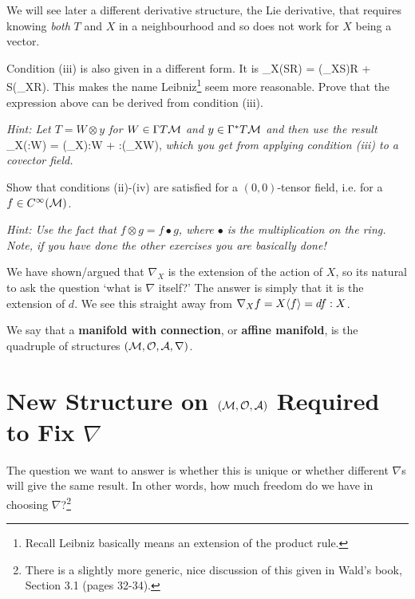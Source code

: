 We will see later a different derivative structure, the Lie derivative, that requires knowing \textit{both} $T$ and $X$ in a neighbourhood and so does not work for $X$ being a vector. 

\bbox
    Condition (iii) is also given in a different form. It is
    \bse 
        \nabla_X(S\otimes R) = (\nabla_XS)\otimes R + S\otimes (\nabla_XR).
    \ese
    This makes the name Leibniz\footnote{Recall Leibniz basically means an extension of the product rule.} seem more reasonable. Prove that the expression above can be derived from condition (iii). 
    
    \textit{Hint: Let $T=W\otimes y$ for $W\in\Gamma T\mathcal{M}$ and $y\in \Gamma^*T\mathcal{M}$ and then use the result}
    \bse 
        \nabla_X(\omega:W) = (\nabla_X\omega):W + \omega:(\nabla_XW),
    \ese 
    \textit{which you get from applying condition (iii) to a covector field.}
\ebox

\bbox 
    Show that conditions (ii)-(iv) are satisfied for a $(0,0)$-tensor field, i.e. for a $f\in C^{\infty}(\mathcal{M})$.
    
    \textit{Hint: Use the fact that $f\otimes g = f\bullet g$, where $\bullet$ is the multiplication on the ring. Note, if you have done the other exercises you are basically done!}
    
\ebox  

\br 
    We have shown/argued that $\nabla_X$ is the extension of the action of $X$, so its natural to ask the question `what is $\nabla$ itself?' The answer is simply that it is the extension of $d$. We see this straight away from $\nabla_Xf = X\langle f\rangle = df:X$.
\er 

    We say that a \textbf{manifold with connection}, or \textbf{affine manifold}, is the quadruple of structures $(\mathcal{M},\mathcal{O},\mathcal{A},\nabla)$.
\ed 

\section{New Structure on $(\mathcal{M},\mathcal{O},\mathcal{A})$ Required to Fix $\nabla$}

The question we want to answer is whether this is unique or whether different $\nabla$s will give the same result. In other words, how much freedom do we have in choosing $\nabla$?\footnote{There is a slightly more generic, nice discussion of this given in Wald's book, Section 3.1 (pages 32-34).}

